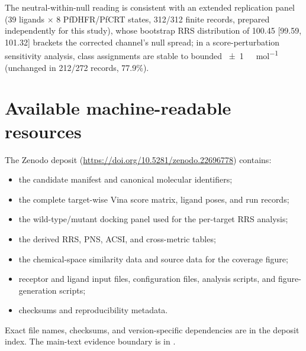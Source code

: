 \documentclass[11pt,a4paper]{article}
\begin{document}
	The neutral-within-null reading is consistent with an extended replication panel (39 ligands $\times$ 8 PfDHFR/PfCRT states, 312/312 finite records, prepared independently for this study), whose bootstrap RRS distribution of 100.45 [99.59, 101.32] brackets the corrected channel's null spread; in a score-perturbation sensitivity analysis, class assignments are stable to bounded \qty{\pm 1}{\kilo\calorie\per\mol} (unchanged in 212/272 records, 77.9\%).
	
	\section{Available machine-readable resources}\label{sec:sm_resources}
	The Zenodo deposit (\url{https://doi.org/10.5281/zenodo.22696778}) contains:
	\begin{itemize}
		\item the candidate manifest and canonical molecular identifiers;
		\item the complete target-wise Vina score matrix, ligand poses, and run records;
		\item the wild-type/mutant docking panel used for the per-target RRS analysis;
		\item the derived RRS, PNS, ACSI, and cross-metric tables;
		\item the chemical-space similarity data and source data for the coverage figure;
		\item receptor and ligand input files, configuration files, analysis scripts, and figure-generation scripts;
		\item checksums and reproducibility metadata.
	\end{itemize}
	Exact file names, checksums, and version-specific dependencies are in the deposit index. The main-text evidence boundary is in .
	
	
	
	
\end{document}
